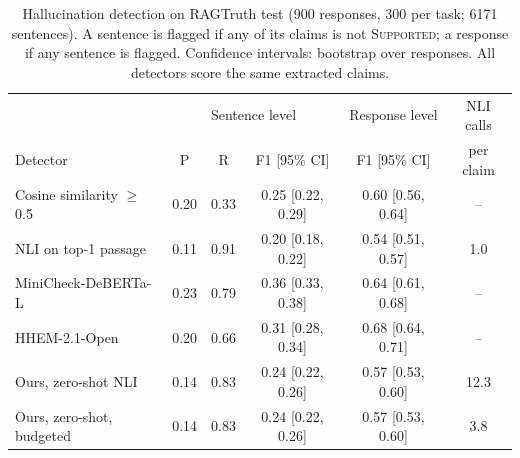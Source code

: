 \begin{table}[t]
\centering\small
\begin{tabular}{lccccc}
\toprule
 & \multicolumn{3}{c}{Sentence level} & Response level & NLI calls \\
Detector & P & R & F1 [95\% CI] & F1 [95\% CI] & per claim \\
\midrule
Cosine similarity $\geq$ 0.5 & 0.20 & 0.33 & 0.25 {\scriptsize[0.22, 0.29]} & 0.60 {\scriptsize[0.56, 0.64]} & -- \\
NLI on top-1 passage & 0.11 & 0.91 & 0.20 {\scriptsize[0.18, 0.22]} & 0.54 {\scriptsize[0.51, 0.57]} & 1.0 \\
MiniCheck-DeBERTa-L & 0.23 & 0.79 & 0.36 {\scriptsize[0.33, 0.38]} & 0.64 {\scriptsize[0.61, 0.68]} & -- \\
HHEM-2.1-Open & 0.20 & 0.66 & 0.31 {\scriptsize[0.28, 0.34]} & 0.68 {\scriptsize[0.64, 0.71]} & -- \\
\midrule
Ours, zero-shot NLI & 0.14 & 0.83 & 0.24 {\scriptsize[0.22, 0.26]} & 0.57 {\scriptsize[0.53, 0.60]} & 12.3 \\
Ours, zero-shot, budgeted & 0.14 & 0.83 & 0.24 {\scriptsize[0.22, 0.26]} & 0.57 {\scriptsize[0.53, 0.60]} & 3.8 \\
\bottomrule
\end{tabular}
\caption{Hallucination detection on RAGTruth test (900 responses, 300 per task; 6171 sentences).
A sentence is flagged if any of its claims is not \textsc{Supported}; a response if any sentence is flagged.
Confidence intervals: bootstrap over responses. All detectors score the same extracted claims.}
\label{tab:ragtruth}
\end{table}
